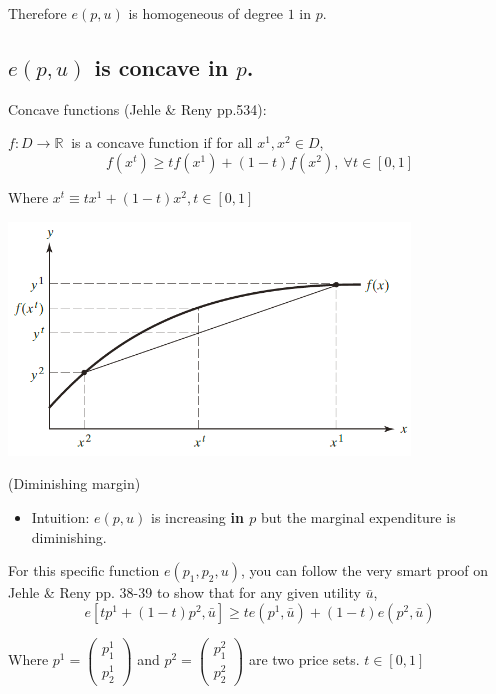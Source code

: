 \documentclass{article}
\newcommand{\R}{\mathbb{R}}
\begin{document}
Therefore $e(p, u)$ is homogeneous of degree $1$ in $p$.

\subsection{$e(p, u)$ is concave in $p$.}

\begin{mdframed}[backgroundcolor=blue!20,linecolor=white]
Concave functions (Jehle \& Reny pp.534):

$f : D \to \R \ $ is a concave function if for all $x^1, x^2 \in D$,
$$f(x^t) \ge tf(x^1) + (1 − t)f(x^2), \ \forall t \in [0, 1]$$

Where $x^t \equiv tx^1 + (1-t)x^2, t \in [0,1]$

\vspace{2mm}
{\centering
\includegraphics[width=0.8\textwidth]{2.concavef}
\label{cf}}
\vspace{2mm}

(Diminishing margin)

\begin{itemize}
\item Intuition: $e(p,u)$ is increasing \textbf{in $p$} but the marginal expenditure is diminishing.
\end{itemize}

For this specific function $e(p_1,p_2,u)$, you can follow the very smart proof on Jehle \& Reny pp. 38-39 to show that for any given utility $\bar{u}$, $$e[tp^1+(1-t)p^2,\bar{u}] \ge te(p^1,\bar{u}) + (1-t)e(p^2,\bar{u})$$

Where $p^1 = \left(\begin{smallmatrix}p^1_1 \\ p^1_2\end{smallmatrix}\right)$ and $p^2 = \left(\begin{smallmatrix}p^2_1 \\ p^2_2\end{smallmatrix}\right)$ are two price sets. $t \in [0,1]$


\end{mdframed}
\end{document}
